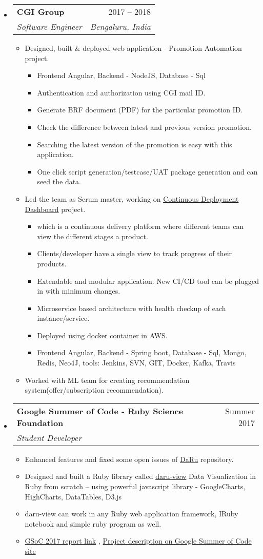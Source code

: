 \documentclass[letterpaper,12pt]{article}[leftmargin=*]
\makeatletter
\def \entryspacing {-0pt}
\newcommand{\resumeEntryStart}{\begin{itemize}[leftmargin=2.5mm]}
\newcommand{\resumeEntryEnd}{\end{itemize}\vspace{\entryspacing}}
\newcommand{\resumeItemListStart}{\begin{itemize}[leftmargin=4.5mm]}
\newcommand{\resumeItemListEnd}{\end{itemize}}
\newcommand{\resumeItem}[1]{
  \item\small{
    {#1 \vspace{-2pt}}
  }
}
\newcommand{\resumeEntryTSDL}[4]{
  \vspace{-1pt}\item[]
    \begin{tabular*}{0.97\textwidth}{l@{\extracolsep{\fill}}r}
      \textbf{\color{primary}#1} & {\firabook\color{accent}\small#2} \\
      \textit{\color{accent}\small#3} & \textit{\color{accent}\small#4} \\
    \end{tabular*}\vspace{-6pt}
}
\makeatother
\begin{document}
  \resumeEntryStart
    \resumeEntryTSDL
      {CGI Group}{ 2017 -- 2018}
      {Software Engineer}{Bengaluru, India}
    \resumeItemListStart
      \resumeItem {Designed, built & deployed web application - Promotion Automation project.}
      \begin{itemize}
         \item Frontend Angular, Backend - NodeJS, Database - Sql
         \item Authentication and authorization using CGI mail ID.
         \item Generate BRF document (PDF) for the particular promotion ID.
         \item Check the difference between latest and previous version promotion.
         \item Searching the latest version of the promotion is easy with this application.
         \item One click script generation/testcase/UAT package generation and can seed the data.
       \end{itemize}
      \resumeItem {Led the team as Scrum master, working on \href{http://slides.com/shekharrajak/dd/}{Continuous Deployment Dashboard} project. }
      \begin{itemize}
          \item which is a continuous delivery platform where different teams can view the different stages a product.
          \item Clients/developer have a single view to track progress of their products.
          \item Extendable and modular application. New CI/CD tool can be plugged in with minimum changes.
          \item Microservice based architecture with health checkup of each instance/service.
          \item Deployed using docker container in AWS.
          \item Frontend Angular, Backend - Spring boot, Database - Sql, Mongo, Redis, Neo4J, tools: Jenkins, SVN, GIT, Docker, Kafka, Travis
      \end{itemize}
      \resumeItem {Worked with ML team for creating recommendation system(offer/subscription recommendation).}
    \resumeItemListEnd
  \resumeEntryEnd


  \resumeEntryStart
    \resumeEntryTSDL
      {Google Summer of Code - Ruby Science Foundation}{Summer 2017}
      {Student Developer}{}
    \resumeItemListStart
        \resumeItem {Enhanced features and fixed some open issues of \href{https://github.com/SciRuby/daru/}{DaRu} repository.}
        \resumeItem {Designed and built a Ruby library called \href{https://github.com/SciRuby/daru-view/}{daru-view} Data Visualization
in Ruby from scratch -- using powerful javascript library - GoogleCharts, HighCharts,
DataTables, D3.js}
        \resumeItem {daru-view can work in any Ruby web application framework, IRuby notebook and simple ruby program as well.}
        \resumeItem {\href{https://shekharrajak.github.io/gsoc_2017_posts/}{GSoC 2017 report link}},
        \href{https://summerofcode.withgoogle.com/archive/2017/projects/5267803426783232/}{Project description on Google Summer of Code site}
    \resumeItemListEnd
  \resumeEntryEnd
\end{document}
